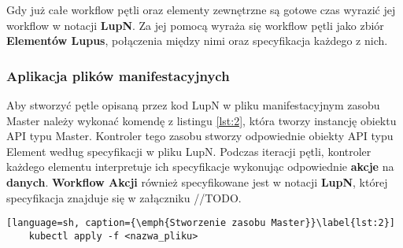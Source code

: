 Gdy już całe workflow pętli oraz elementy zewnętrzne są gotowe czas wyrazić jej workflow w notacji \textbf{LupN}. Za jej pomocą wyraża się workflow pętli jako zbiór  \textbf{Elementów Lupus}, połączenia między nimi oraz specyfikacja każdego z nich.

\subsubsection{Aplikacja plików manifestacyjnych}

Aby stworzyć pętle opisaną przez kod LupN w pliku manifestacyjnym zasobu Master należy wykonać komendę z listingu \ref{lst:2}, która tworzy instancję obiektu API typu Master. Kontroler tego zasobu stworzy odpowiednie obiekty API typu Element według specyfikacji w pliku LupN. Podczas iteracji pętli, kontroler każdego elementu interpretuje ich specyfikacje wykonując odpowiednie \textbf{akcje} na \textbf{danych}. \textbf{Workflow Akcji} również specyfikowane jest w notacji \textbf{LupN}, której specyfikacja znajduje się w załączniku //TODO.


\begin{lstlisting}[language=sh, caption={\emph{Stworzenie zasobu Master}}\label{lst:2}]
    kubectl apply -f <nazwa_pliku>
\end{lstlisting}
